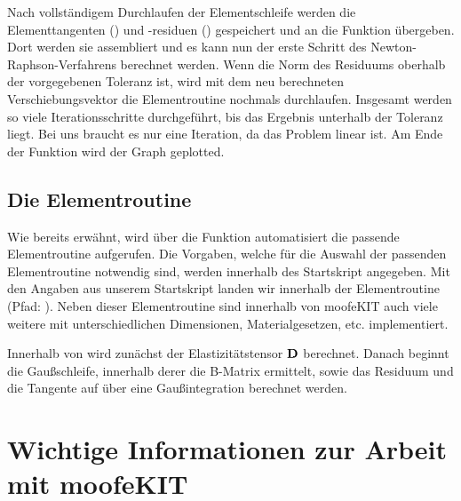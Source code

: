 \documentclass[12pt,bibstyle=none,pagenumberinfooter]{ifmdocument}
\begin{document}
Nach vollst\"andigem Durchlaufen der Elementschleife werden die Elementtangenten () und -residuen ()  gespeichert und an die Funktion  übergeben. Dort werden sie assembliert und es kann nun der erste Schritt des Newton-Raphson-Verfahrens berechnet werden. Wenn die Norm des Residuums oberhalb der vorgegebenen Toleranz ist, wird mit dem neu berechneten Verschiebungsvektor die Elementroutine nochmals durchlaufen. Insgesamt werden so viele Iterationsschritte durchgeführt, bis das Ergebnis unterhalb der Toleranz liegt. Bei uns braucht es nur eine Iteration, da das Problem linear ist. Am Ende der Funktion  wird der Graph geplotted.

\subsection{Die Elementroutine}
Wie bereits erw\"ahnt, wird \"uber die Funktion  automatisiert die passende Elementroutine aufgerufen. Die Vorgaben, welche f\"ur die Auswahl der passenden Elementroutine notwendig sind, werden innerhalb des Startskript angegeben. Mit den Angaben aus unserem Startskript landen wir innerhalb der Elementroutine  (Pfad: ). Neben dieser Elementroutine sind innerhalb von moofeKIT auch viele weitere mit unterschiedlichen Dimensionen, Materialgesetzen, etc. implementiert.

Innerhalb von  wird zun\"achst der Elastizit\"atstensor $\mbox{\boldmath $\mathrm{D}$}$ berechnet. Danach beginnt die Gaußschleife, innerhalb derer die B-Matrix ermittelt, sowie das Residuum und die Tangente auf über eine Gaußintegration berechnet werden.


\section{Wichtige Informationen zur Arbeit mit moofeKIT}
\end{document}
